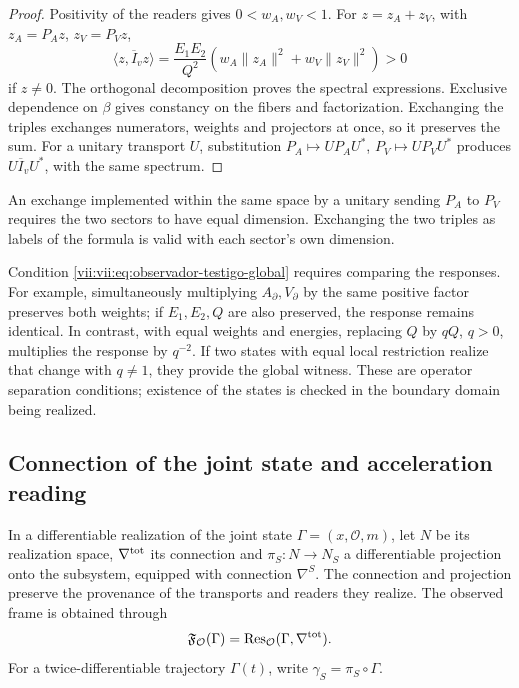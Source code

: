 \begin{proof}
Positivity of the readers gives \(0<w_A,w_V<1\). For
\(z=z_A+z_V\), with \(z_A=P_Az\), \(z_V=P_Vz\),
\[
 \langle z,\overline I_vz\rangle
 =\frac{E_1E_2}{Q^2}
   (w_A\|z_A\|^2+w_V\|z_V\|^2)>0
\]
if \(z\neq0\). The orthogonal decomposition proves the spectral
expressions. Exclusive dependence on \(\beta\) gives constancy
on the fibers and factorization. Exchanging the triples
exchanges numerators, weights and projectors at once, so it
preserves the sum. For a unitary transport \(U\), substitution
\(P_A\mapsto UP_AU^*\), \(P_V\mapsto UP_VU^*\) produces
\(U\overline I_vU^*\), with the same spectrum.
\end{proof}

An exchange implemented within the same space by a unitary
sending \(P_A\) to \(P_V\) requires the two sectors to have
equal dimension. Exchanging the two triples as labels of the
formula is valid with each sector's own dimension.

Condition \eqref{vii:vii:eq:observador-testigo-global} requires comparing
the responses. For example, simultaneously multiplying
\(A_\partial,V_\partial\) by the same positive factor preserves
both weights; if \(E_1,E_2,Q\) are also preserved, the response
remains identical. In contrast, with equal weights and energies, replacing
\(Q\) by \(qQ\), \(q>0\), multiplies the response by \(q^{-2}\).
If two states with equal local restriction realize that change with
\(q\neq1\), they provide the global witness. These are operator
separation conditions; existence of the states is checked
in the boundary domain being realized.

\subsection{Connection of the joint state and acceleration reading}
\label{vii:vii:sec:observador-autoinercia}

In a differentiable realization of the joint state
\(\Gamma=(x,\mathcal O,m)\), let \(N\) be its realization space,
\(\nabla^{\rm tot}\) its connection and \(\pi_S:N\to N_S\) a
differentiable projection onto the subsystem, equipped with connection
\(\nabla^S\). The connection and projection preserve the provenance
of the transports and readers they realize. The observed frame is
obtained through
\[
 \mathfrak F_{\mathcal O}(\Gamma)
 =\operatorname{Res}_{\mathcal O}(\Gamma,\nabla^{\rm tot}).
\]
For a twice-differentiable trajectory \(\Gamma(t)\),
write \(\gamma_S=\pi_S\circ\Gamma\).

